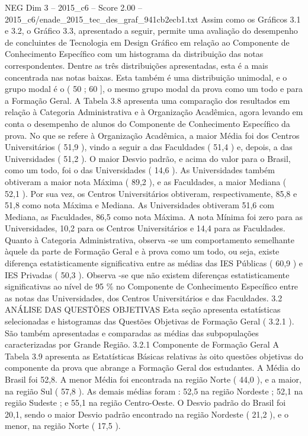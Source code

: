 \begin{textsample}{NEG Dim 3 – 2015\_c6 – Score 2.00 – 2015\_c6/enade\_2015\_tec\_des\_graf\_941cb2ecb1.txt}
Assim como os Gráficos 3.1 e 3.2, o Gráfico 3.3, apresentado a seguir, permite uma avaliação do desempenho de concluintes de Tecnologia em Design Gráfico em relação ao Componente de Conhecimento Específico com um histograma da distribuição das notas correspondentes.
Dentre as três distribuições apresentadas, esta é a mais concentrada nas notas baixas.
Esta também é uma distribuição unimodal, e o grupo modal é o ( 50 ; 60 ], o mesmo grupo modal da prova como um todo e para a Formação Geral.
A Tabela 3.8 apresenta uma comparação dos resultados em relação à Categoria Administrativa e à Organização Acadêmica, agora levando em conta o desempenho de alunos do Componente de Conhecimento Específico da prova.
No que se refere à Organização Acadêmica, a maior Média foi dos Centros Universitários ( 51,9 ), vindo a seguir a das Faculdades ( 51,4 ) e, depois, a das Universidades ( 51,2 ).
O maior Desvio padrão, e acima do valor para o Brasil, como um todo, foi o das Universidades ( 14,6 ).
As Universidades também obtiveram a maior nota Máxima ( 89,2 ), e as Faculdades, a maior Mediana ( 52,1 ).
Por sua vez, os Centros Universitários obtiveram, respectivamente, 85,8 e 51,8 como nota Máxima e Mediana.
As Universidades obtiveram 51,6 com Mediana, as Faculdades, 86,5 como nota Máxima.
A nota Mínima foi zero para as Universidades, 10,2 para os Centros Universitários e 14,4 para as Faculdades.
Quanto à Categoria Administrativa, observa -se um comportamento semelhante àquele da parte de Formação Geral e à prova como um todo, ou seja, existe diferença estatisticamente significativa entre as médias das IES Públicas ( 60,9 ) e IES Privadas ( 50,3 ).
Observa -se que não existem diferenças estatisticamente significativas ao nível de 95 \% no Componente de Conhecimento Específico entre as notas das Universidades, dos Centros Universitários e das Faculdades. 3.2 ANÁLISE DAS QUESTÕES OBJETIVAS Esta seção apresenta estatísticas selecionadas e histogramas das Questões Objetivas de Formação Geral ( 3.2.1 ).
São também apresentadas e comparadas as médias das subpopulações caracterizadas por Grande Região. 3.2.1 Componente de Formação Geral A Tabela 3.9 apresenta as Estatísticas Básicas relativas às oito questões objetivas do componente da prova que abrange a Formação Geral dos estudantes.
A Média do Brasil foi 52,8.
A menor Média foi encontrada na região Norte ( 44,0 ), e a maior, na região Sul ( 57,8 ).
As demais médias foram : 52,5 na região Nordeste ; 52,1 na região Sudeste ; e 55,1 na região Centro-Oeste.
O Desvio padrão do Brasil foi 20,1, sendo o maior Desvio padrão encontrado na região Nordeste ( 21,2 ), e o menor, na região Norte ( 17,5 ).

\end{textsample}
